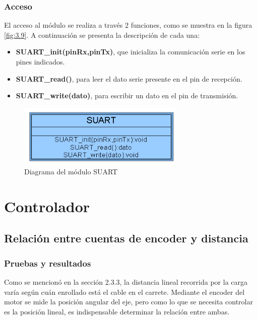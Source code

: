 \subsubsection{Acceso}

El acceso al módulo se realiza a través 2 funciones, como se muestra en la figura \ref{fig:3.9}. A continuación se presenta la descripción de cada una:
\begin{itemize}
	\item \textbf{SUART\_init(pinRx,pinTx)}, que inicializa la comunicación serie en los pines indicados.
	\item \textbf{SUART\_read()}, para leer el dato serie presente en el pin de recepción.
	\item \textbf{SUART\_write(dato)}, para escribir un dato en el pin de transmisión.
\end{itemize}

\begin{figure}[!ht]
	\centering
	\includegraphics[width=8cm,scale=1]{resources/3_9-moduloSUART.png}
	\caption{Diagrama del módulo SUART}
	\label{fig:\thefigure}
\end{figure}



\section{Controlador} \label{sec:\thesection}

\subsection{Relación entre cuentas de encoder y distancia}
\subsubsection{Pruebas y resultados}
Como se mencionó en la sección 2.3.3, la distancia lineal recorrida por la carga varía según cuán enrollado está el cable en el carrete. Mediante el encoder del motor se mide la posición angular del eje, pero como lo que se necesita controlar es la posición lineal, es indispensable determinar la relación entre ambas.

